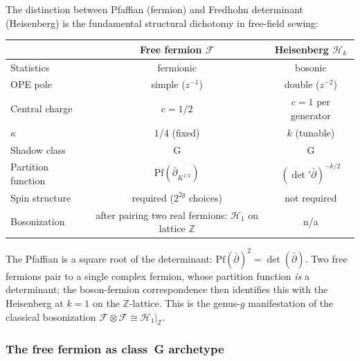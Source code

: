 \begin{remark}
\label{rem:pfaffian-vs-determinant}
The distinction between Pfaffian \textup{(}fermion\textup{)} and
Fredholm determinant \textup{(}Heisenberg\textup{)} is the fundamental
structural dichotomy in free-field sewing:
\begin{center}
\small
\renewcommand{\arraystretch}{1.2}
\begin{tabular}{lcc}
\toprule
& \textbf{Free fermion $\mathcal{F}$}
 & \textbf{Heisenberg $\mathcal{H}_k$} \\
\midrule
Statistics & fermionic & bosonic \\
OPE pole & simple ($z^{-1}$) & double ($z^{-2}$) \\
Central charge & $c = 1/2$ & $c = 1$ per generator \\
$\kappa$ & $1/4$ \textup{(fixed)} & $k$ \textup{(tunable)} \\
Shadow class & G & G \\
Partition function & $\mathrm{Pf}(\bar\partial_{K^{1/2}})$
 & $(\det' \bar\partial)^{-k/2}$ \\
Spin structure & required ($2^{2g}$ choices)
 & not required \\
Bosonization & after pairing two real fermions: $\mathcal{H}_1$ on
 lattice $\mathbb{Z}$
 & n/a \\
\bottomrule
\end{tabular}
\end{center}
The Pfaffian is a square root of the determinant:
$\mathrm{Pf}(\bar\partial)^2 = \det(\bar\partial)$. Two free fermions pair to
a single complex fermion, whose partition function \emph{is} a
determinant; the boson-fermion correspondence then identifies this with
the Heisenberg at $k = 1$ on the $\mathbb{Z}$-lattice. This is the
genus-$g$ manifestation of the classical bosonization
$\mathcal{F} \otimes \mathcal{F} \cong \mathcal{H}_1|_{\mathbb{Z}}$.
\end{remark}

\subsubsection{The free fermion as class~G archetype}
\label{sec:fermion-class-g-archetype}%
%

